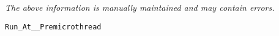 \label{pkg:run\_at\_\_premicrothread}

{\tiny \it The above information is manually maintained and may contain errors.}
\begin{verbatim}
Run_At__Premicrothread
\end{verbatim}
